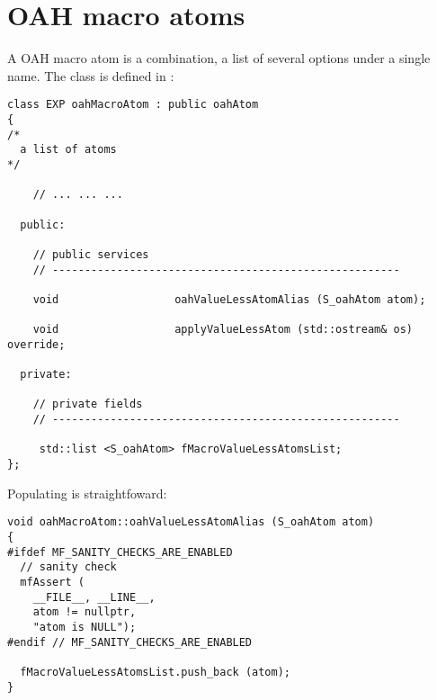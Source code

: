 \section{OAH macro atoms}

A OAH macro atom is a combination, a list of several options under a single name. The  class   is defined in :
\begin{lstlisting}[language=CPlusPlus]
class EXP oahMacroAtom : public oahAtom
{
/*
  a list of atoms
*/

	// ... ... ...

  public:

    // public services
    // ------------------------------------------------------

    void                  oahValueLessAtomAlias (S_oahAtom atom);

    void                  applyValueLessAtom (std::ostream& os) override;

  private:

    // private fields
    // ------------------------------------------------------

     std::list <S_oahAtom> fMacroValueLessAtomsList;
};
\end{lstlisting}

Populating  is straightfoward:
\begin{lstlisting}[language=CPlusPlus]
void oahMacroAtom::oahValueLessAtomAlias (S_oahAtom atom)
{
#ifdef MF_SANITY_CHECKS_ARE_ENABLED
  // sanity check
  mfAssert (
    __FILE__, __LINE__,
    atom != nullptr,
    "atom is NULL");
#endif // MF_SANITY_CHECKS_ARE_ENABLED

  fMacroValueLessAtomsList.push_back (atom);
}
\end{lstlisting}

